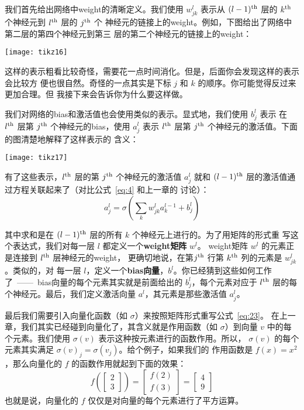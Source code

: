 我们首先给出网络中\gls*{weight}的清晰定义。我们使用 $w^l_{jk}$ 表示从
$(l-1)^{\rm th}$ 层的 $k^{\rm th}$ 个神经元到 $l^{\rm th}$ 层的 $j^{\rm th}$ 个
神经元的链接上的\gls*{weight}。例如，下图给出了网络中第二层的第四个神经元到第三
层的第二个神经元的链接上的\gls*{weight}：

\begin{center}
  \texttt{[image: tikz16]}
\end{center}

这样的表示粗看比较奇怪，需要花一点时间消化。但是，后面你会发现这样的表示会比较方
便也很自然。奇怪的一点其实是下标 $j$ 和 $k$ 的顺序。你可能觉得反过来更加合理。但
我接下来会告诉你为什么要这样做。

我们对网络的\gls*{bias}和激活值也会使用类似的表示。显式地，我们使用 $b^l_j$ 表示
在 $l^{\rm th}$ 层第 $j^{\rm th}$ 个神经元的\gls*{bias}，使用 $a^l_j$ 表示
$l^{\rm th}$ 层第 $j^{\rm th}$ 个神经元的激活值。下面的图清楚地解释了这样表示的
含义：

\begin{center}
  \texttt{[image: tikz17]}
\end{center}

有了这些表示，$l^{\rm th}$ 层的第 $j^{\rm th}$ 个神经元的激活值 $a^{l}_j$ 就和
$(l-1)^{\rm th}$ 层的激活值通过方程关联起来了（对比公式~\eqref{eq:4} 和上一章的
  讨论）：
\begin{equation}
  a^{l}_j = \sigma\left( \sum_k w^{l}_{jk} a^{l-1}_k + b^l_j \right)
  \label{eq:23}\tag{23}
\end{equation}

其中求和是在 $(l-1)^{\rm th}$ 层的所有 $k$ 个神经元上进行的。为了用矩阵的形式重
写这个表达式，我们对每一层 $l$ 都定义一个\textbf{\gls*{weight}矩阵} $w^l$。%
\gls*{weight}矩阵 $w^l$ 的元素正是连接到 $l^{\rm th}$ 层神经元的\gls*{weight}，
更确切地说，在第$j^{\rm th}$ 行第 $k^{\rm th}$ 列的元素是 $w^l_{jk}$。类似的，对
每一层 $l$，定义一个\textbf{\gls*{bias}向量}，$b^l$。你已经猜到这些如何工作
了~——~\gls*{bias}向量的每个元素其实就是前面给出的 $b^l_j$，每个元素对应于
$l^{\rm th}$ 层的每个神经元。最后，我们定义激活向量 $a^l$，其元素是那些激活值
$a^l_j$。

最后我们需要引入向量化函数（如 $\sigma$）来按照矩阵形式重写公式~\eqref{eq:23}。
在上一章，我们其实已经碰到向量化了，其含义就是作用函数（如 $\sigma$）到向量 $v$
中的每个元素。我们使用 $\sigma(v)$ 表示这种按元素进行的函数作用。所以，
$\sigma(v)$ 的每个元素其实满足 $\sigma(v)_j = \sigma(v_j)$。给个例子，如果我们的
作用函数是 $f(x) = x^2$，那么向量化的 $f$ 的函数作用就起到下面的效果：
\begin{equation}
  f\left(\left[ \begin{array}{c} 2 \\ 3 \end{array} \right] \right)
  = \left[ \begin{array}{c} f(2) \\ f(3) \end{array} \right]
  = \left[ \begin{array}{c} 4 \\ 9 \end{array} \right]
\label{eq:24}\tag{24}
\end{equation}
也就是说，向量化的 $f$ 仅仅是对向量的每个元素进行了平方运算。

